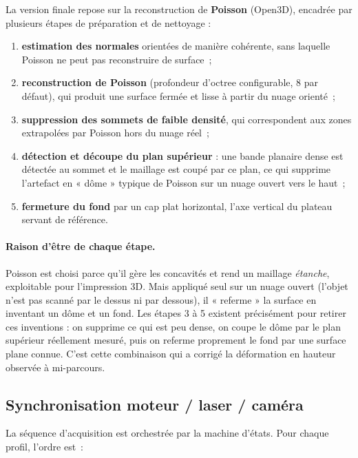La version finale repose sur la reconstruction de \textbf{Poisson} (Open3D),
encadrée par plusieurs étapes de préparation et de nettoyage :

\begin{enumerate}
  \item \textbf{estimation des normales} orientées de manière cohérente, sans
        laquelle Poisson ne peut pas reconstruire de surface~;
  \item \textbf{reconstruction de Poisson} (profondeur d'octree configurable,
        8 par défaut), qui produit une surface fermée et lisse à partir du
        nuage orienté~;
  \item \textbf{suppression des sommets de faible densité}, qui correspondent
        aux zones extrapolées par Poisson hors du nuage réel~;
  \item \textbf{détection et découpe du plan supérieur} : une bande planaire
        dense est détectée au sommet et le maillage est coupé par ce plan, ce
        qui supprime l'artefact en « dôme » typique de Poisson sur un nuage
        ouvert vers le haut~;
  \item \textbf{fermeture du fond} par un cap plat horizontal, l'axe vertical
        du plateau servant de référence.
\end{enumerate}

\paragraph{Raison d'être de chaque étape.}
Poisson est choisi parce qu'il gère les concavités et rend un maillage
\emph{étanche}, exploitable pour l'impression 3D. Mais appliqué seul sur un
nuage ouvert (l'objet n'est pas scanné par le dessus ni par dessous), il
« referme » la surface en inventant un dôme et un fond. Les étapes 3 à 5
existent précisément pour retirer ces inventions : on supprime ce qui est peu
dense, on coupe le dôme par le plan supérieur réellement mesuré, puis on
referme proprement le fond par une surface plane connue. C'est cette
combinaison qui a corrigé la déformation en hauteur observée à mi-parcours.

\subsection{Synchronisation moteur / laser / caméra}

La séquence d'acquisition est orchestrée par la machine d'états. Pour chaque
profil, l'ordre est~:

